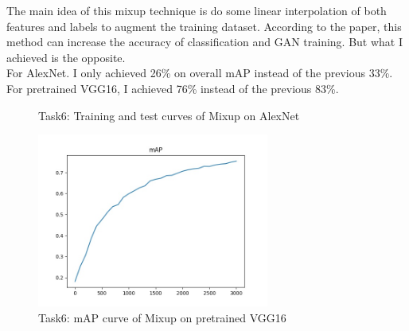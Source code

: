 \documentclass[12pt]{report}
\begin{document}
\begin{outline}
The main idea of this mixup technique is do some linear interpolation of both features and labels to augment the training dataset. According to the paper, this method can increase the accuracy of classification and GAN training. But what I achieved is the opposite.\\
For AlexNet. I only achieved 26\% on overall mAP instead of the previous 33\%. For pretrained VGG16, I achieved 76\% instead of the previous 83\%. \\

\begin{figure}[!h]
  \centering
  \caption{Task6: Training and test curves of Mixup on AlexNet}
\label{fig:short}
\end{figure}

\begin{figure}[!h]
  \centering
    \includegraphics[width=3in]{task6_mAP_plot_vgg16_mixup.jpg}
  \caption{Task6: mAP curve of Mixup on pretrained VGG16}
\label{fig:short}
\end{figure}

\end{outline}
\end{document}
